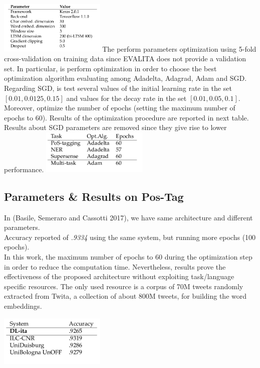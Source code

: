\documentclass[twocolumn,10pt]{wmrDoc}
\begin{document}
\vskip 0.5cm
\includegraphics[width=0.38\textwidth]{figure/paramBiLSTM.png}
\vskip0.5cm
The perform parameters optimization using 5-fold cross-validation on training data since EVALITA does not provide a validation set. In particular, is perform optimization in order to choose the best optimization algorithm evaluating among Adadelta, Adagrad, Adam and SGD. 
Regarding SGD, is test several values of the initial learning rate in the set ${[0.01, 0.0125, 0.15]}$ and values for the decay rate in the set ${[0.01, 0.05, 0.1]}$.
Moreover, optimize the number of epochs (setting the maximum number of epochs to 60).
Results of the optimization procedure are reported in next table. Results about SGD parameters are removed since they give rise to lower performance.
\vskip 0.5cm
\includegraphics[width=0.38\textwidth]{figure/resultBiLSTMOPT.png}
\vskip0.5cm



\subsection{Parameters \& Results on Pos-Tag }
 In \cite{DBLP:conf/clic-it/BasileSC17}(Basile, Semeraro and Cassotti 2017), we have same architecture and different parameters.\\
 Accuracy reported of \textit{.9334} using the same system, but running more epochs (100 epochs).\\
 In this work, the maximum number of epochs to 60 during the optimization step in order to reduce the computation time. 
 Nevertheless, results prove the effectiveness of the proposed architecture without exploiting task/language specific resources. The only used resource is a corpus of 70M tweets randomly extracted from Twita, a collection of about 800M tweets, for building the word embeddings.

\vskip 0.5cm
\includegraphics[width=0.38\textwidth]{figure/posttask.png}
\vskip0.5cm
\end{document}
